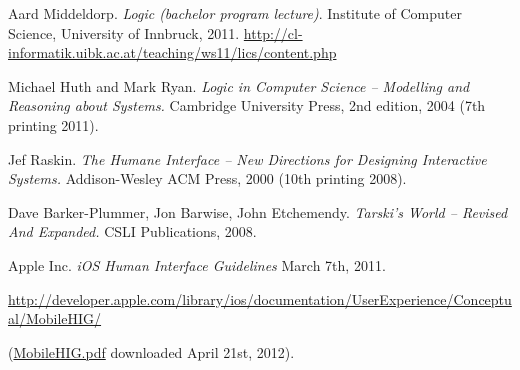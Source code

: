 
\begin{thebibliography}{10}

 Aard Middeldorp. \textit{Logic (bachelor program lecture)}. Institute of Computer Science, University of Innbruck, 2011.
\url{http://cl-informatik.uibk.ac.at/teaching/ws11/lics/content.php}

 Michael Huth and Mark Ryan. \textit{Logic in Computer Science -- Modelling and Reasoning about Systems.} Cambridge University Press, 2nd edition, 2004 (7th printing 2011). 

 Jef Raskin. \textit{The Humane Interface -- New Directions for Designing Interactive Systems.} Addison-Wesley ACM Press, 2000 (10th printing 2008). 

 Dave Barker-Plummer, Jon Barwise, John Etchemendy. \textit{Tarski's World -- Revised And Expanded.} CSLI Publications, 2008.

 Apple Inc.  \textit{iOS Human Interface Guidelines} March 7th, 2011. 

\url{http://developer.apple.com/library/ios/documentation/UserExperience/Conceptual/MobileHIG/}

(\href{https://developer.apple.com/library/ios/documentation/UserExperience/Conceptual/MobileHIG/MobileHIG.pdf}
{MobileHIG.pdf} 
downloaded April 21st, 2012).




%


\end{thebibliography}
